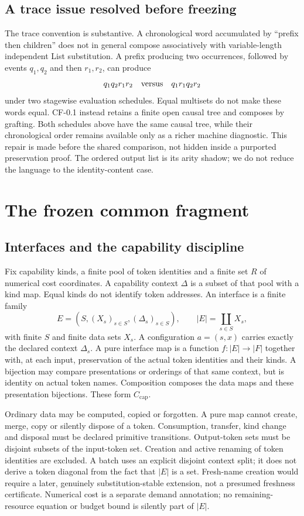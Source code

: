 \documentclass[11pt,a4paper]{article}
\theoremstyle{definition}
\begin{document}
\subsection{A trace issue resolved before freezing}
The trace convention is substantive. A chronological word accumulated by
``prefix then children'' does not in general compose associatively with
variable-length independent List substitution. A prefix producing two
occurrences, followed by events $q_1,q_2$ and then $r_1,r_2$, can produce
\[
 q_1q_2r_1r_2\quad\hbox{versus}\quad q_1r_1q_2r_2
\]
under two stagewise evaluation schedules. Equal multisets do not make these
words equal. CF-0.1 instead retains a finite open causal tree and composes
by grafting. Both schedules above have the same causal tree, while their
chronological order remains available only as a richer machine diagnostic.
This repair is made before the shared comparison, not hidden inside a
purported preservation proof. The ordered output list is its arity shadow;
we do not reduce the language to the identity-content case.

\section{The frozen common fragment}\label{sec:freeze}

\subsection{Interfaces and the capability discipline}
Fix capability kinds, a finite pool of token identities and a finite set
$R$ of numerical cost coordinates. A capability context $\Delta$ is a
subset of that pool with a kind map. Equal kinds do not identify token addresses.
An interface is a finite family
\[
 E=(S,(X_s)_{s\in S},(\Delta_s)_{s\in S}),\qquad
 |E|=\coprod_{s\in S}X_s,
\]
with finite $S$ and finite data sets $X_s$. A configuration $a=(s,x)$ carries
exactly the declared context $\Delta_s$.
A pure interface map is a function $f:|E|\to|F|$ together with, at each
input, preservation of the actual token identities and their kinds. A
bijection may compare presentations or orderings of that same context,
but is identity on actual token names. Composition composes the data maps
and these presentation bijections.
These form $C_{\mathrm{cap}}$.

Ordinary data may be computed, copied or forgotten. A pure map cannot create,
merge, copy or silently dispose of a token. Consumption, transfer, kind
change and disposal must be declared primitive transitions. Output-token
sets must be disjoint subsets of the input-token set. Creation and active
renaming of token identities are excluded. A batch uses an explicit
disjoint context split; it does not derive a token diagonal from the fact
that $|E|$ is a set. Fresh-name creation would require a later, genuinely
substitution-stable extension, not a presumed freshness certificate. Numerical cost is a separate demand annotation; no
remaining-resource equation or budget bound is silently part of $|E|$.
\end{document}
